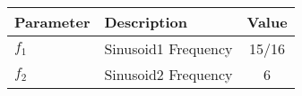 \begin{tabular}{|l|l|c|}
\hline
\textbf{Parameter} & \textbf{Description} & \textbf{Value} \\
\hline
$f_{1}$ & Sinusoid1 Frequency & 15/16 \\
\hline
$f_{2}$ & Sinusoid2 Frequency & 6 \\
\hline
\end{tabular}

